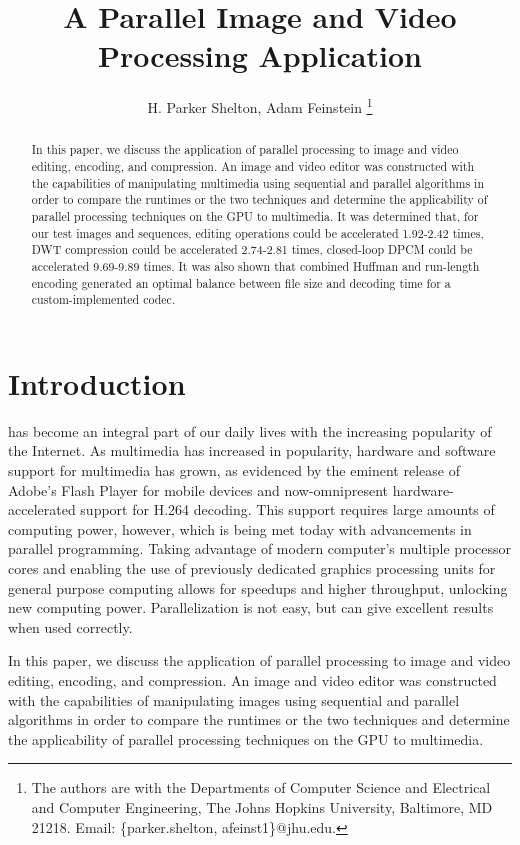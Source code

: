 \documentclass[10pt,twocolumn,twoside]{IEEEtran}
\begin{document}
\title{A Parallel Image and Video Processing Application}
\author{H. Parker Shelton, Adam Feinstein
\thanks{The authors are with the Departments of Computer Science and Electrical and Computer Engineering, The Johns Hopkins University, Baltimore, MD 21218.
Email: \{parker.shelton, afeinst1\}@jhu.edu.}}

\maketitle
\vskip -20pt

\begin{abstract}
In this paper, we discuss the application of parallel processing to image and video editing, encoding, and compression. An image and video editor was constructed with the capabilities of manipulating multimedia using sequential and parallel algorithms in order to compare the runtimes or the two techniques and determine the applicability of parallel processing techniques on the GPU to multimedia. It was determined that, for our test images and sequences, editing operations could be accelerated 1.92-2.42 times, DWT compression could be accelerated 2.74-2.81 times, closed-loop DPCM could be accelerated 9.69-9.89 times. It was also shown that combined Huffman and run-length encoding generated an optimal balance between file size and decoding time for a custom-implemented codec.
\end{abstract}

\section{Introduction}
 has become an integral part of our daily lives with the increasing popularity of the Internet. As multimedia has increased in popularity, hardware and software support for multimedia has grown, as evidenced by the eminent release of Adobe's Flash Player for mobile devices and now-omnipresent hardware-accelerated support for H.264 decoding. This support requires large amounts of computing power, however, which is being met today with advancements in parallel programming. Taking advantage of modern computer's multiple processor cores and enabling the use of previously dedicated graphics processing units for general purpose computing allows for speedups and higher throughput, unlocking new computing power. Parallelization is not easy, but can give excellent results when used correctly.

In this paper, we discuss the application of parallel processing to image and video editing, encoding, and compression. An image and video editor was constructed with the capabilities of manipulating images using sequential and parallel algorithms in order to compare the runtimes or the two techniques and determine the applicability of parallel processing techniques on the GPU to multimedia.
\end{document}

